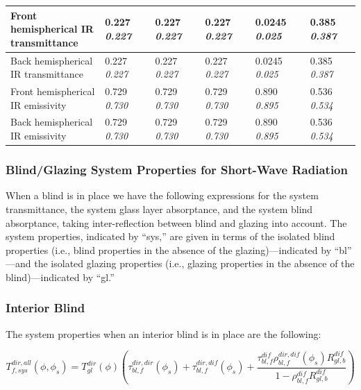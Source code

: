 \begin{longtable}[c]{p{1.0in}p{0.4in}p{0.4in}p{0.4in}p{0.4in}p{0.4in}p{0.4in}p{0.4in}p{0.4in}p{0.4in}p{0.4in}}
Front hemispherical IR transmittance & 0.227 \quad \quad \textit{0.227} &  & 0.227 \quad \quad \textit{0.227} &  & 0.227 \quad \quad \textit{0.227} &  & 0.0245 \quad \quad \textit{0.025} &  & 0.385 \quad \quad \textit{0.387} &  \tabularnewline \midrule
Back hemispherical IR transmittance & 0.227 \quad \quad \textit{0.227} &  & 0.227 \quad \quad \textit{0.227} &  & 0.227 \quad \quad \textit{0.227} &  & 0.0245 \quad \quad \textit{0.025} &  & 0.385 \quad \quad \textit{0.387} &  \tabularnewline \midrule
Front hemispherical IR emissivity & 0.729 \quad \quad \textit{0.730} &  & 0.729 \quad \quad \textit{0.730} &  & 0.729 \quad \quad \textit{0.730} &  & 0.890 \quad \quad \textit{0.895} &  & 0.536 \quad \quad \textit{0.534} &  \tabularnewline \midrule
Back hemispherical IR emissivity & 0.729 \quad \quad \textit{0.730} &  & 0.729 \quad \quad \textit{0.730} &  & 0.729 \quad \quad \textit{0.730} &  & 0.890 \quad \quad \textit{0.895} &  & 0.536 \quad \quad \textit{0.534} &  \tabularnewline \midrule
\bottomrule
\end{longtable}

\subsubsection{Blind/Glazing System Properties for Short-Wave Radiation}\label{blindglazing-system-properties-for-short-wave-radiation}

When a blind is in place we have the following expressions for the system transmittance, the system glass layer absorptance, and the system blind absorptance, taking inter-reflection between blind and glazing into account. The system properties, indicated by ``sys,'' are given in terms of the isolated blind properties (i.e., blind properties in the absence of the glazing)---indicated by ``bl'' ---and the isolated glazing properties (i.e., glazing properties in the absence of the blind)---indicated by ``gl.''

\subsubsection{Interior Blind}\label{interior-blind}

The system properties when an interior blind is in place are the following:

\begin{equation}
T_{f,sys}^{dir,all}(\phi ,{\phi_s}) = T_{gl}^{dir}(\phi )\left( {\tau_{bl,f}^{dir,dir}({\phi_s}) + \tau_{bl,f}^{dir,dif}({\phi_s}) + \frac{{\tau_{bl,f}^{dif}\rho_{bl,f}^{dir,dif}({\phi_s})R_{gl,b}^{dif}}}{{1 - \rho_{bl,f}^{dif}R_{gl,b}^{dif}}}} \right)
\end{equation}

